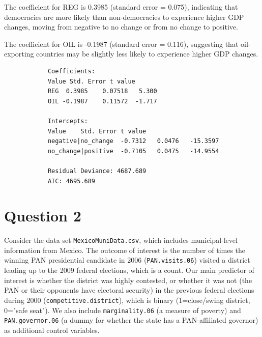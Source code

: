 \documentclass[12pt,letterpaper]{article}
\begin{document}
\begin{enumerate}
{			The coefficient for REG is 0.3985 (standard error = 0.075), indicating that democracies 
			are more likely than non-democracies to experience higher GDP changes, moving from 
			negative to no change or from no change to positive. 
			
			The coefficient for OIL is -0.1987 (standard error = 0.116), suggesting that 
			oil-exporting countries may be slightly less likely to experience higher GDP changes.} 
			
					\begin{verbatim}
			Coefficients:
			Value Std. Error t value
			REG  0.3985    0.07518   5.300
			OIL -0.1987    0.11572  -1.717
			
			Intercepts:
			Value    Std. Error t value 
			negative|no_change  -0.7312   0.0476   -15.3597
			no_change|positive  -0.7105   0.0475   -14.9554
			
			Residual Deviance: 4687.689 
			AIC: 4695.689  
			\end{verbatim}
	\end{enumerate}
	
	\section*{Question 2} 
	\vspace{.25cm}
	
	\noindent Consider the data set \texttt{MexicoMuniData.csv}, which includes municipal-level information from Mexico. The outcome of interest is the number of times the winning PAN presidential candidate in 2006 (\texttt{PAN.visits.06}) visited a district leading up to the 2009 federal elections, which is a count. Our main predictor of interest is whether the district was highly contested, or whether it was not (the PAN or their opponents have electoral security) in the previous federal elections during 2000 (\texttt{competitive.district}), which is binary (1=close/swing district, 0="safe seat"). We also include \texttt{marginality.06} (a measure of poverty) and \texttt{PAN.governor.06} (a dummy for whether the state has a PAN-affiliated governor) as additional control variables. 
	
\end{document}
